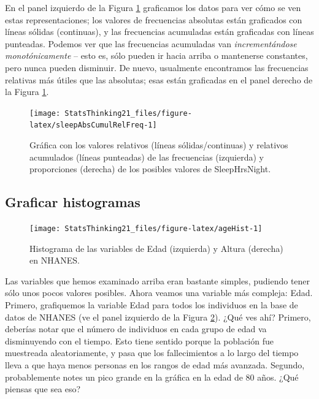 \documentclass[
  12pt,
]{book}
\theoremstyle{definition}
\theoremstyle{definition}
\theoremstyle{definition}
\theoremstyle{remark}
\begin{document}
En el panel izquierdo de la Figura \ref{fig:sleepAbsCumulRelFreq} graficamos los datos para ver cómo se ven estas representaciones; los valores de frecuencias absolutas están graficados con líneas sólidas (continuas), y las frecuencias acumuladas están graficadas con líneas punteadas. Podemos ver que las frecuencias acumuladas van \emph{incrementándose monotónicamente} -- esto es, sólo pueden ir hacia arriba o mantenerse constantes, pero nunca pueden disminuir. De nuevo, usualmente encontramos las frecuencias relativas más útiles que las absolutas; esas están graficadas en el panel derecho de la Figura \ref{fig:sleepAbsCumulRelFreq}.

\begin{figure}
\texttt{[image: StatsThinking21\_files/figure-latex/sleepAbsCumulRelFreq-1]} \caption{Gráfica con los valores relativos (líneas sólidas/continuas) y relativos acumulados (líneas punteadas) de las frecuencias (izquierda) y proporciones (derecha) de los posibles valores de SleepHrsNight.}\label{fig:sleepAbsCumulRelFreq}
\end{figure}

\hypertarget{plotting-histograms}{%
\subsection{Graficar histogramas}\label{plotting-histograms}}

\begin{figure}
\texttt{[image: StatsThinking21\_files/figure-latex/ageHist-1]} \caption{Histograma de las variables de Edad (izquierda) y Altura (derecha) en NHANES.}\label{fig:ageHist}
\end{figure}

Las variables que hemos examinado arriba eran bastante simples, pudiendo tener sólo unos pocos valores posibles. Ahora veamos una variable más compleja: Edad. Primero, grafiquemos la variable Edad para todos los individuos en la base de datos de NHANES (ve el panel izquierdo de la Figura \ref{fig:ageHist}). ¿Qué ves ahí? Primero, deberías notar que el número de individuos en cada grupo de edad va disminuyendo con el tiempo. Esto tiene sentido porque la población fue muestreada aleatoriamente, y pasa que los fallecimientos a lo largo del tiempo lleva a que haya menos personas en los rangos de edad más avanzada. Segundo, probablemente notes un pico grande en la gráfica en la edad de 80 años. ¿Qué piensas que sea eso?
\end{document}
